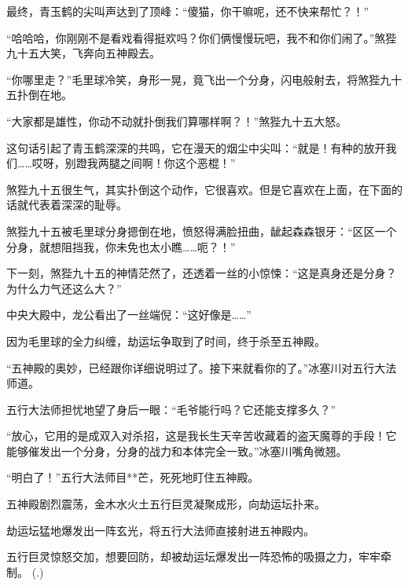 \begin{this_body}
最终，青玉鹤的尖叫声达到了顶峰：“傻猫，你干嘛呢，还不快来帮忙？！”

“哈哈哈，你刚刚不是看戏看得挺欢吗？你们俩慢慢玩吧，我不和你们闹了。”煞狴九十五大笑，飞奔向五神殿去。

“你哪里走？”毛里球冷笑，身形一晃，竟飞出一个分身，闪电般射去，将煞狴九十五扑倒在地。

“大家都是雄性，你动不动就扑倒我们算哪样啊？！”煞狴九十五大怒。

这句话引起了青玉鹤深深的共鸣，它在漫天的烟尘中尖叫：“就是！有种的放开我们……哎呀，别蹬我两腿之间啊！你这个恶棍！”

煞狴九十五很生气，其实扑倒这个动作，它很喜欢。但是它喜欢在上面，在下面的话就代表着深深的耻辱。

煞狴九十五被毛里球分身摁倒在地，愤怒得满脸扭曲，龇起森森银牙：“区区一个分身，就想阻挡我，你未免也太小瞧……呃？！”

下一刻，煞狴九十五的神情茫然了，还透着一丝的小惊悚：“这是真身还是分身？为什么力气还这么大？”

中央大殿中，龙公看出了一丝端倪：“这好像是……”

因为毛里球的全力纠缠，劫运坛争取到了时间，终于杀至五神殿。

“五神殿的奥妙，已经跟你详细说明过了。接下来就看你的了。”冰塞川对五行大法师道。

五行大法师担忧地望了身后一眼：“毛爷能行吗？它还能支撑多久？”

“放心，它用的是成双入对杀招，这是我长生天辛苦收藏着的盗天魔尊的手段！它能够催发出一个分身，分身的战力和本体完全一致。”冰塞川嘴角微翘。

“明白了！”五行大法师目**芒，死死地盯住五神殿。

五神殿剧烈震荡，金木水火土五行巨灵凝聚成形，向劫运坛扑来。

劫运坛猛地爆发出一阵玄光，将五行大法师直接射进五神殿内。

五行巨灵惊怒交加，想要回防，却被劫运坛爆发出一阵恐怖的吸摄之力，牢牢牵制。	 (.)

\end{this_body}

